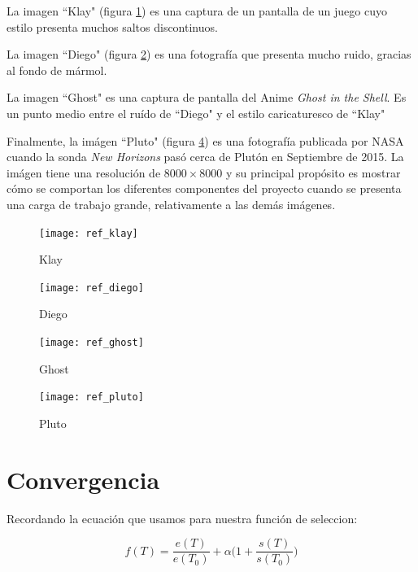 La imagen ``Klay" (figura \ref{fig:ref-klay}) es una captura de un pantalla de
un juego cuyo estilo presenta muchos saltos discontinuos.

La imagen ``Diego" (figura \ref{fig:ref-diego}) es una fotografía que presenta
mucho ruido, gracias al fondo de mármol.

La imagen ``Ghost" es una captura de pantalla del Anime \emph{Ghost in the
Shell}. Es un punto medio entre el ruído de ``Diego" y el estilo caricaturesco
de ``Klay"

Finalmente, la imágen ``Pluto" (figura \ref{fig:ref-pluto}) es una fotografía
publicada por NASA cuando la sonda \emph{New Horizons} pasó cerca de Plutón en
Septiembre de 2015. La imágen tiene una resolución de $8000\times8000$ y su
principal propósito es mostrar cómo se comportan los diferentes componentes del
proyecto cuando se presenta una carga de trabajo grande, relativamente a las
demás imágenes.

\begin{figure}[b]
    \texttt{[image: ref\_klay]}
    \caption{Klay}
    \label{fig:ref-klay}
\end{figure}

\begin{figure}[b]
    \texttt{[image: ref\_diego]}
    \caption{Diego}
    \label{fig:ref-diego}
\end{figure}

\begin{figure}[b]
    \texttt{[image: ref\_ghost]}
    \caption{Ghost}
    \label{fig:ref-ghost}
\end{figure}

\begin{figure}[b]
    \texttt{[image: ref\_pluto]}
    \caption{Pluto}
    \label{fig:ref-pluto}
\end{figure}


\section{Convergencia}

Recordando la ecuación que usamos para nuestra función de seleccion:

\begin{equation}
f(T) = \frac{e(T)}{e(T_0)} + \alpha \Big(1 + \frac{s(T)}{s(T_0)}\Big)
\end{equation}\label{eq:fitness-repeated}

